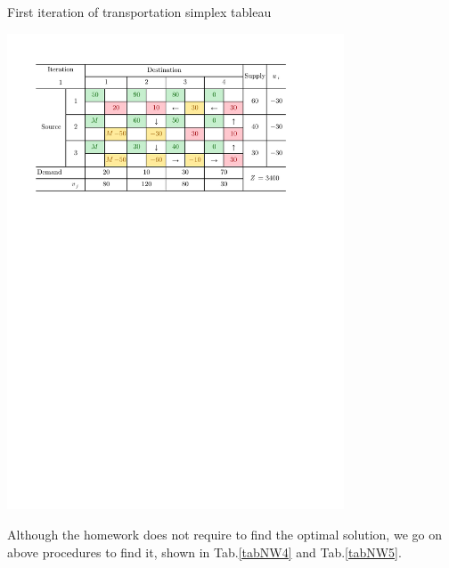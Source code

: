 \documentclass[a4paper]{article}
\begin{document}
\begin{enumerate}
\begin{enumerate}
\begin{solution}
		\begin{table}[H]
			\caption{First iteration of transportation simplex tableau}
			\label{tab5}
			\centering
			\includegraphics[width = 0.75\textwidth]{NW3}				
		\end{table}

		
		Although the homework does not require to find the optimal solution, we go on above procedures to find it, shown in Tab.\ref{tabNW4} and Tab.\ref{tabNW5}.
		

\end{solution}
\end{enumerate}
\end{enumerate}
\end{document}
